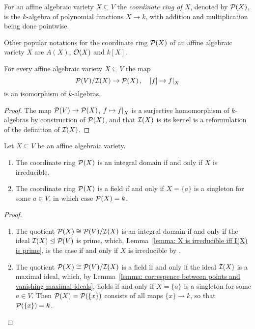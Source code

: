 \begin{definition}
  For an affine algebraic variety $X \subseteq V$ the \emph{coordinate ring of $X$}, denoted by $\mathcal{P}(X)$, is the $k$-algebra of polynomial functions $X \to k$, with addition and multiplication being done pointwise.
\end{definition}


\begin{remark}
  Other popular notations for the coordinate ring $\mathcal{P}(X)$ of an affine algebraic variety $X$ are $A(X)$, $\mathcal{O}(X)$ and $k[X]$.
\end{remark}


\begin{lemma}
  \label{lemma: coordinate ring as quotient}
  For every affine algebraic variety $X \subseteq V$ the map
  \[
            \mc{P}(V)/\mc{I}(X)
    \to     \mc{P}(X) \,,
    \quad   [f]
    \mapsto \restrict{f}{X}
  \]
  is an isomorphism of $k$-algebras.
\end{lemma}


\begin{proof}
  The map $\mathcal{P}(V) \to \mathcal{P}(X)$, $f \mapsto \restrict{f}{X}$ is a surjective homomorphism of $k$-algebras by construction of $\mathcal{P}(X)$, and that $\mathcal{I}(X)$ is its kernel is a reformulation of the definition of $\mathcal{I}(X)$.
\end{proof}


\begin{corollary}
  Let $X \subseteq V$ be an affine algebraic variety.
  \begin{enumerate}
    \item
      The coordinate ring $\mathcal{P}(X)$ is an integral domain if and only if $X$ is irreducible.
    \item
      The coordinate ring $\mathcal{P}(X)$ is a field if and only if $X = \{a\}$ is a singleton for some $a \in V$, in which case $\mathcal{P}(X) = k$.
  \end{enumerate}
\end{corollary}


\begin{proof}
  \leavevmode
  \begin{enumerate}
    \item
      The quotient $\mathcal{P}(X) \cong \mathcal{P}(V)/\mathcal{I}(X)$ is an integral domain if and only if the ideal $\mathcal{I}(X) \trianglelefteq \mathcal{P}(V)$ is prime, which, Lemma~\ref{lemma: X is irreducible iff I(X) is prime}, is the case if and only if $X$ is irreducible by .
    \item
      The quotient $\mathcal{P}(X) \cong \mathcal{P}(V)/\mathcal{I}(X)$ is a field if and only if the ideal $\mathcal{I}(X)$ is a maximal ideal, which, by Lemma~\ref{lemma: correspence between points and vanishing maximal ideals}, holds if and only if $X = \{a\}$ is a singleton for some $a \in V$.
      Then $\mathcal{P}(X) = \mathcal{P}(\{x\})$ consists of all maps $\{x\} \to k$, so that $\mathcal{P}(\{x\}) = k$.
    \qedhere
  \end{enumerate}
\end{proof}


